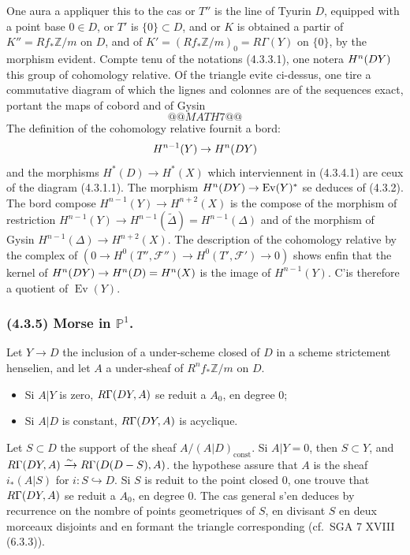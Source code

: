 \documentclass[12pt,a4paper]{article}
\theoremstyle{plain}
\theoremstyle{definition}
\theoremstyle{remark}
\newcommand{\const}{\text{const}}
\DeclareMathOperator{\Ev}{Ev}
\let\mod\relax
\DeclareMathOperator{\mod}{mod}
\newcommand{\bbZ}{\mathbb{Z}}
\newcommand{\bbP}{\mathbb{P}}
\newcommand{\scrF}{\mathscr{F}}
\begin{document}
One aura a appliquer this to the cas or $T''$ is the line of Tyurin $D$, equipped with a point base $0 \in D$, or $T'$ is $\{0\} \subset D$, and or $K$ is obtained a partir of $K'' = Rf_*\bbZ/m$ on $D$, and of $K' = (Rf_*\bbZ/m)_0 = R\Gamma(Y)$ on $\{0\}$, by the morphism evident. Compte tenu of the notations (4.3.3.1), one notera $H^n(D \mod Y)$ this group of cohomology relative. Of the triangle evite ci-dessus, one tire a commutative diagram of which the lignes and colonnes are of the sequences exact, portant the maps of cobord and of Gysin
\[
@@MATH7@@
\tag{4.3.4.1}
\]
The definition of the cohomology relative fournit a bord:
\[
H^{n-1}(Y) \to H^n(D \mod Y)
\]
and the morphisms $H^*(D) \to H^*(X)$ which interviennent in (4.3.4.1) are ceux of the diagram (4.3.1.1). The morphism $H^n(D \mod Y) \to \Ev(Y)^*$ se deduces of (4.3.2). The bord compose $H^{n-1}(Y) \to H^{n+2}(X)$ is the compose of the morphism of restriction $H^{n-1}(Y) \to H^{n-1}(\widetilde{\Delta}) = H^{n-1}(\Delta)$ and of the morphism of Gysin $H^{n-1}(\Delta) \to H^{n+2}(X)$. The description of the cohomology relative by the complex of $(0 \to H^0(T'', \scrF'') \to H^0(T', \scrF') \to 0)$ shows enfin that the kernel of $H^n(D \mod Y) \to H^n(D) = H^n(X)$ is the image of $H^{n-1}(Y)$. C'is therefore a quotient of $\Ev(Y)$.

\subsubsection*{\textup{(4.3.5)} Morse in $\bbP^1$.}

Let $Y \to D$ the inclusion of a under-scheme closed of $D$ in a scheme strictement henselien, and let $A$ a under-sheaf of $R^n f_* \bbZ/m$ on $D$.
\begin{itemize}
\item[(i)] Si $A|Y$ is zero, $R\Gamma(D \mod Y, A)$ se reduit a $A_0$, en degree $0$;
\item[(ii)] Si $A|D$ is constant, $R\Gamma(D \mod Y, A)$ is acyclique.
\end{itemize}

Let $S \subset D$ the support of the sheaf $A/(A|D)_{\const}$. Si $A|Y = 0$, then $S \subset Y$, and $R\Gamma(D \mod Y, A) \xrightarrow{\sim} R\Gamma(D \mod (D - S), A)$. the hypothese assure that $A$ is the sheaf $i_*(A|S)$ for $i : S \hookrightarrow D$. Si $S$ is reduit to the point closed $0$, one trouve that $R\Gamma(D \mod Y, A)$ se reduit a $A_0$, en degree $0$. The cas general s'en deduces by recurrence on the nombre of points geometriques of $S$, en divisant $S$ en deux morceaux disjoints and en formant the triangle corresponding (cf.~SGA 7 XVIII (6.3.3)).
\end{document}
